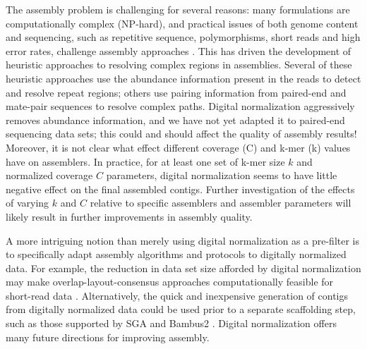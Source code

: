 \documentclass{pnastwo}
\begin{document}
\begin{article}
The assembly problem is challenging for several reasons: many
formulations are computationally complex (NP-hard), and practical issues of both genome content
and sequencing, such as repetitive sequence, polymorphisms, short
reads and high error rates, challenge assembly approaches
\cite{pubmed19580519}.  This has driven the development of heuristic
approaches to resolving complex regions in assemblies.  Several of
these heuristic approaches use the abundance information present in
the reads to detect and resolve repeat regions; others use pairing
information from paired-end and mate-pair sequences to resolve complex
paths.  Digital normalization aggressively removes abundance
information, and we have not yet adapted it to paired-end sequencing
data sets; this could and should affect the quality of assembly
results! Moreover, it is not clear what effect different coverage (C)
and k-mer (k) values have on assemblers.
In practice, for at least
one set of k-mer size $k$ and normalized coverage $C$ parameters, digital
normalization seems to have little negative effect on the final
assembled contigs.  Further investigation of the effects of varying
$k$ and $C$ relative to specific assemblers and assembler parameters
will likely result in further improvements in assembly quality.

A more intriguing notion than merely using digital normalization as a
pre-filter is to specifically adapt assembly algorithms and protocols
to digitally normalized data.  For example, the reduction in data set
size afforded by digital normalization may make
overlap-layout-consensus approaches computationally feasible for
short-read data \cite{pubmed20211242}.  Alternatively, the quick and
inexpensive generation of contigs from digitally normalized data could
be used prior to a separate scaffolding step, such as those supported
by SGA and Bambus2 \cite{pubmed20529929,pubmed21926123}.  Digital
normalization offers many future directions for improving assembly.


\end{article}
\end{document}
